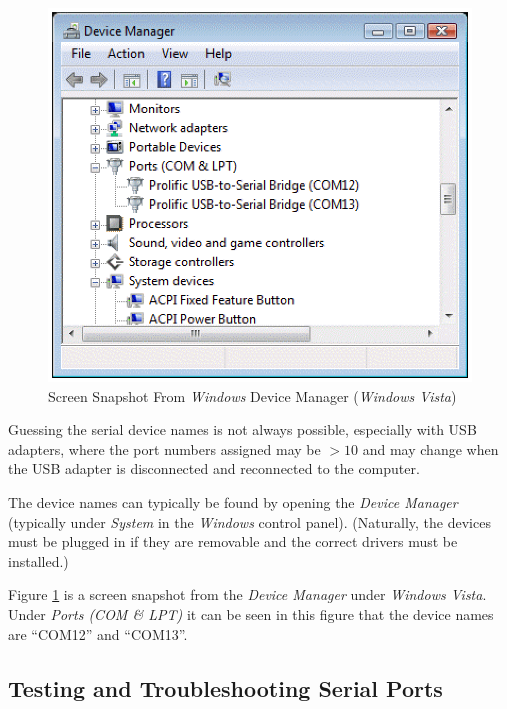 \documentclass[letterpaper,10pt,titlepage]{article}
\begin{document}
\begin{figure}
\centering
\includegraphics[width=4.6in]{devmancomassignmentsa.eps}
\caption{Screen Snapshot From \emph{Windows} Device Manager 
         (\emph{Windows Vista})}
\label{fig:susg0:sfdn0:01}
\end{figure}

Guessing the serial device names is not always possible, especially with USB adapters,
where the port numbers assigned may be $>10$ and may change when the USB adapter
is disconnected and reconnected to the computer.

The device names can typically be found by opening the \emph{Device Manager} (typically
under \emph{System} in the \emph{Windows} control panel).  (Naturally, the
devices must be plugged in if they are removable and the correct drivers
must be installed.)

Figure \ref{fig:susg0:sfdn0:01} is a screen snapshot from the \emph{Device Manager}
under \emph{Windows Vista}.  Under \emph{Ports (COM \& LPT)} it can be seen
in this figure that the device names are ``COM12'' and ``COM13''.


\subsection{Testing and Troubleshooting Serial Ports}
\label{susg0:stts0}
\end{document}
